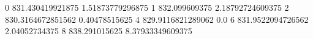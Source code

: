 0 831.430419921875 1.51873779296875
1 832.099609375 2.18792724609375
2 830.3164672851562 0.40478515625
4 829.9116821289062 0.0
6 831.9522094726562 2.04052734375
8 838.291015625 8.37933349609375
